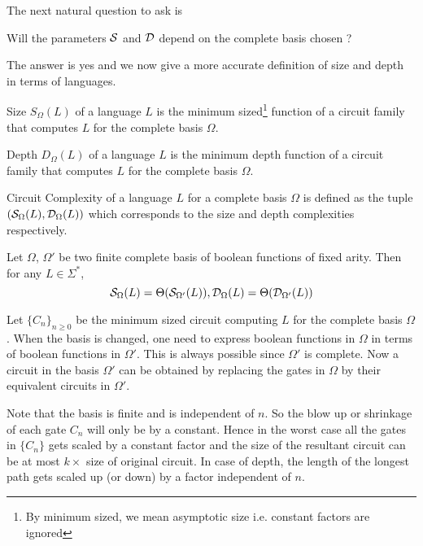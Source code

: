 The next natural question to ask is 
\begin{center}
Will the parameters ${\cal S}$ and ${\cal D}$ depend on the complete basis chosen ?
\end{center}
The answer is yes and we now give a more accurate definition of size and
depth in terms of languages.
\begin{definition}Size $S_\Omega(L)$ of a language $L$ is the minimum
sized\footnote{By minimum sized, we mean asymptotic size i.e. constant
factors are ignored} function of a circuit family that computes $L$ for the
complete basis $\Omega$.
\end{definition}
\begin{definition}Depth $D_\Omega(L)$ of a language $L$ is the minimum
depth function of a circuit family that computes $L$ for the
complete basis $\Omega$.
\end{definition}

\begin{definition}Circuit Complexity of a language $L$ for a complete basis
$\Omega$ is defined as the tuple $({\cal S}_\Omega(L), {\cal D}_\Omega(L))$ which
corresponds to the size and depth complexities respectively.
\end{definition}

\begin{claim}
\label{basis}
Let $\Omega$, $\Omega'$ be two finite complete basis of boolean functions of
fixed arity. Then for any $L \in \Sigma^*$,
\[ {\cal S}_\Omega(L) = \Theta({\cal S}_{\Omega'}(L)), 
 {\cal D}_\Omega(L) = \Theta({\cal D}_{\Omega'}(L)) \] 
\end{claim}
\begin{proof-idea}
Let $\{C_n\}_{n \ge 0}$ be the minimum sized circuit computing $L$ for the
complete basis $\Omega$. When the basis is changed, one need to express
boolean functions in $\Omega$ in terms of boolean functions in $\Omega'$.
This is always possible since $\Omega'$ is complete. Now a circuit in
the basis $\Omega'$ can be obtained by replacing the gates in $\Omega$ by
their equivalent circuits in $\Omega'$.

Note that the basis is finite and is independent of $n$. So the blow up or
shrinkage of each gate $C_n$ will only be by a constant. Hence in the worst
case all the gates in $\{C_n\}$ gets scaled by a constant factor and the size
of the resultant circuit can be at most $k \times$ size of original circuit. 
In case of depth, the length of the longest path gets scaled up (or down) by 
a factor independent of $n$.
\end{proof-idea}


